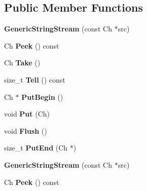 \subsection*{Public Member Functions}
\begin{DoxyCompactItemize}
\item 
\mbox{\label{structGenericStringStream_a6b20885ed64e33f5d081a1e83b07da06}} 
{\bfseries Generic\+String\+Stream} (const Ch $\ast$src)
\item 
\mbox{\label{structGenericStringStream_a0c8fea9c2740c2953af9b3bb28bd469b}} 
Ch {\bfseries Peek} () const
\item 
\mbox{\label{structGenericStringStream_a0d26e3e77e4fca64a87c2d71f48ac5e5}} 
Ch {\bfseries Take} ()
\item 
\mbox{\label{structGenericStringStream_abc73d04baf4c7c58f383bc52536e8ac4}} 
size\+\_\+t {\bfseries Tell} () const
\item 
\mbox{\label{structGenericStringStream_a88c908b4dac9773240ce4bca4b6dd837}} 
Ch $\ast$ {\bfseries Put\+Begin} ()
\item 
\mbox{\label{structGenericStringStream_aaa59dc5313151a4125bf7840f87a33eb}} 
void {\bfseries Put} (Ch)
\item 
\mbox{\label{structGenericStringStream_a5ff1a870d9334cd054cf4ca34c86ddc3}} 
void {\bfseries Flush} ()
\item 
\mbox{\label{structGenericStringStream_a07b942bacda494afb3b2f7629cef14af}} 
size\+\_\+t {\bfseries Put\+End} (Ch $\ast$)
\item 
\mbox{\label{structGenericStringStream_a6b20885ed64e33f5d081a1e83b07da06}} 
{\bfseries Generic\+String\+Stream} (const Ch $\ast$src)
\item 
\mbox{\label{structGenericStringStream_a0c8fea9c2740c2953af9b3bb28bd469b}} 
Ch {\bfseries Peek} () const
\item 

\end{DoxyCompactItemize}
